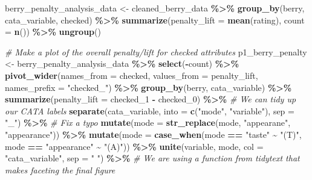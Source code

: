 \documentclass[
]{book}
\newenvironment{Shaded}{\begin{snugshade}}{\end{snugshade}}
\newcommand{\AttributeTok}[1]{\textcolor[rgb]{0.13,0.29,0.53}{#1}}
\newcommand{\CommentTok}[1]{\textcolor[rgb]{0.56,0.35,0.01}{\textit{#1}}}
\newcommand{\FunctionTok}[1]{\textcolor[rgb]{0.13,0.29,0.53}{\textbf{#1}}}
\newcommand{\NormalTok}[1]{#1}
\newcommand{\OtherTok}[1]{\textcolor[rgb]{0.56,0.35,0.01}{#1}}
\newcommand{\SpecialCharTok}[1]{\textcolor[rgb]{0.81,0.36,0.00}{\textbf{#1}}}
\newcommand{\StringTok}[1]{\textcolor[rgb]{0.31,0.60,0.02}{#1}}
\begin{document}
\begin{Shaded}
\begin{Highlighting}[]
\NormalTok{berry\_penalty\_analysis\_data }\OtherTok{\textless{}{-}} 
\NormalTok{  cleaned\_berry\_data }\SpecialCharTok{\%\textgreater{}\%}
  \FunctionTok{group\_by}\NormalTok{(berry, cata\_variable, checked) }\SpecialCharTok{\%\textgreater{}\%}
  \FunctionTok{summarize}\NormalTok{(}\AttributeTok{penalty\_lift =} \FunctionTok{mean}\NormalTok{(rating),}
            \AttributeTok{count =} \FunctionTok{n}\NormalTok{()) }\SpecialCharTok{\%\textgreater{}\%}
  \FunctionTok{ungroup}\NormalTok{() }

\CommentTok{\# Make a plot of the overall penalty/lift for checked attributes}
\NormalTok{p1\_berry\_penalty }\OtherTok{\textless{}{-}} 
\NormalTok{  berry\_penalty\_analysis\_data }\SpecialCharTok{\%\textgreater{}\%}
  \FunctionTok{select}\NormalTok{(}\SpecialCharTok{{-}}\NormalTok{count) }\SpecialCharTok{\%\textgreater{}\%}
  \FunctionTok{pivot\_wider}\NormalTok{(}\AttributeTok{names\_from =}\NormalTok{ checked,}
              \AttributeTok{values\_from =}\NormalTok{ penalty\_lift,}
              \AttributeTok{names\_prefix =} \StringTok{"checked\_"}\NormalTok{) }\SpecialCharTok{\%\textgreater{}\%}
  \FunctionTok{group\_by}\NormalTok{(berry, cata\_variable) }\SpecialCharTok{\%\textgreater{}\%}
  \FunctionTok{summarize}\NormalTok{(}\AttributeTok{penalty\_lift =}\NormalTok{ checked\_1 }\SpecialCharTok{{-}}\NormalTok{ checked\_0) }\SpecialCharTok{\%\textgreater{}\%}
  \CommentTok{\# We can tidy up our CATA labels}
  \FunctionTok{separate}\NormalTok{(cata\_variable, }
           \AttributeTok{into =} \FunctionTok{c}\NormalTok{(}\StringTok{"mode"}\NormalTok{, }\StringTok{"variable"}\NormalTok{), }
           \AttributeTok{sep =} \StringTok{"\_"}\NormalTok{) }\SpecialCharTok{\%\textgreater{}\%}
  \CommentTok{\# Fix a typo}
  \FunctionTok{mutate}\NormalTok{(}\AttributeTok{mode =} \FunctionTok{str\_replace}\NormalTok{(mode, }\StringTok{"appearane"}\NormalTok{, }\StringTok{"appearance"}\NormalTok{)) }\SpecialCharTok{\%\textgreater{}\%}
  \FunctionTok{mutate}\NormalTok{(}\AttributeTok{mode =} \FunctionTok{case\_when}\NormalTok{(mode }\SpecialCharTok{==} \StringTok{"taste"} \SpecialCharTok{\textasciitilde{}} \StringTok{"(T)"}\NormalTok{,}
\NormalTok{                          mode }\SpecialCharTok{==} \StringTok{"appearance"} \SpecialCharTok{\textasciitilde{}} \StringTok{"(A)"}\NormalTok{)) }\SpecialCharTok{\%\textgreater{}\%}
  \FunctionTok{unite}\NormalTok{(variable, mode, }\AttributeTok{col =} \StringTok{"cata\_variable"}\NormalTok{, }\AttributeTok{sep =} \StringTok{" "}\NormalTok{) }\SpecialCharTok{\%\textgreater{}\%}
  \CommentTok{\# We are using a function from tidytext that makes faceting the final figure}

\end{Highlighting}
\end{Shaded}
\end{document}
